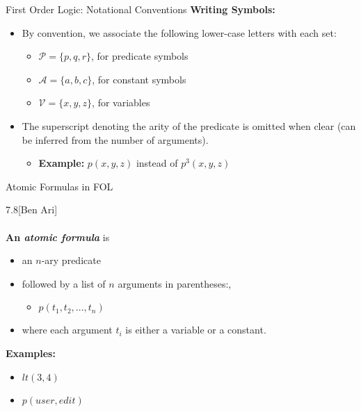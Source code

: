 \documentclass[style=sailor,size=12pt]{powerdot}
\begin{document}
\begin{slide}[bm=,toc=]{First Order Logic: Notational Conventions}
\textbf{Writing Symbols:}
\begin{itemize}
\item<2-> By convention, we associate the following lower-case letters with each
set:
\begin{itemize}
\item $\mathcal{P} = \{p,q,r\}$, for predicate symbols
\item $\mathcal{A} = \{a,b,c\}$, for constant symbols
\item $\mathcal{V} = \{x,y,z\}$, for variables
\end{itemize}
\item<3-> The superscript denoting the arity of the predicate is omitted when clear (can
    be inferred from the number of arguments).
\begin{itemize}
\item<4-> \textbf{Example:} \pause[4] $p(x,y,z)$ instead of $p^3(x,y,z)$
\end{itemize}
\end{itemize}
\end{slide}

\begin{wideslide}[bm=,toc=]{Atomic Formulas in FOL}
\begin{defn}{7.8}[Ben Ari]
~\\~\\
\textbf{ An \emph{atomic formula}} is
\begin{itemize}
\item<2-> an $n$-ary predicate 
\item<3-> followed by a list of $n$ arguments in parentheses:, 
\begin{itemize}
\item<4-> $p(t_1,t_2,...,t_n)$
\end{itemize}
\item<5-> where each argument $t_i$ is either a variable or a constant. 
\end{itemize}
\pause[5]
\textbf{Examples:}
\begin{itemize}
\item $lt(3,4)$
\item $p(user, edit)$
\end{itemize}

\end{defn}
\end{wideslide}
\end{document}
